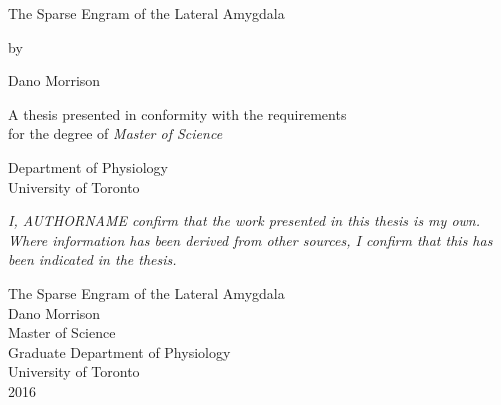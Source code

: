 \documentclass[12pt,a4paperpaper,]{report}
\date{}
\begin{document}
\begin{titlepage}
    \begin{center}

    
   
        
        \vspace*{2.5cm}
        
        \huge
        The Sparse Engram of the Lateral Amygdala
        
        \vspace{1.5cm}

        by
        \vspace{1.5cm}
        
        \Large
        Dano Morrison

        \vspace{1.5cm}

        \normalsize
        A thesis presented in conformity with the requirements\\
        for the degree of \textit{Master of Science}
        
        \vfill
        
        \normalsize
        Department of Physiology\\
        University of Toronto

        \vspace{0.8cm}


    \end{center}
\end{titlepage}

\vspace*{\fill}

\noindent  \textit{
I, AUTHORNAME confirm that the work presented in this thesis is my own. Where information has been derived from other sources, I confirm that this has been indicated in the thesis.
} \vspace*{\fill}

\begin{center}
\Large
      The Sparse Engram of the Lateral Amygdala\\[2ex]
      Dano Morrison\\
      Master of Science\\
      Graduate Department of Physiology\\
      University of Toronto\\
      2016\\
\end{center}
\end{document}
